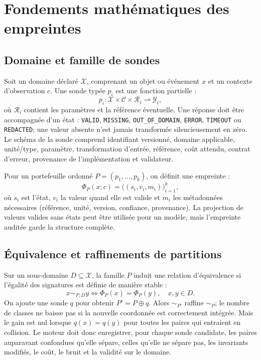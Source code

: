 \documentclass[11pt,a4paper]{report}
\newcommand{\FP}{\Phi}
\begin{document}
\chapter{Fondements mathématiques des empreintes}
\section{Domaine et famille de sondes}
Soit un domaine déclaré $\mathcal{X}$, comprenant un objet ou événement $x$ et un contexte d'observation $c$. Une sonde typée $p_i$ est une fonction partielle :
\[
 p_i: \mathcal{X}\times\mathcal{C}\times\mathcal{R}_i \rightharpoonup \mathcal{Y}_i,
\]
où $\mathcal{R}_i$ contient les paramètres et la référence éventuelle. Une réponse doit être accompagnée d'un état : \texttt{VALID}, \texttt{MISSING}, \texttt{OUT\_OF\_DOMAIN}, \texttt{ERROR}, \texttt{TIMEOUT} ou \texttt{REDACTED}; une valeur absente n'est jamais transformée silencieusement en zéro. Le schéma de la sonde comprend identifiant versionné, domaine applicable, unité/type, paramètre, transformation d'entrée, référence, coût attendu, contrat d'erreur, provenance de l'implémentation et validateur.

Pour un portefeuille ordonné $P=(p_1,\ldots,p_k)$, on définit une empreinte :
\[
 \FP_P(x;c)=\big((s_i,v_i,m_i)\big)_{i=1}^{k},
\]
où $s_i$ est l'état, $v_i$ la valeur quand elle est valide et $m_i$ les métadonnées nécessaires (référence, unité, version, confiance, provenance). La projection de valeurs valides sans états peut être utilisée pour un modèle, mais l'empreinte auditée garde la structure complète.

\section{Équivalence et raffinements de partitions}
Sur un sous-domaine $D\subseteq\mathcal{X}$, la famille $P$ induit une relation d'équivalence si l'égalité des signatures est définie de manière stable :
\[
 x\sim_{P,D}y\iff \FP_P(x)=\FP_P(y),\quad x,y\in D.
\]
On ajoute une sonde $q$ pour obtenir $P' = P\oplus q$. Alors $\sim_{P'}$ raffine $\sim_P$; le nombre de classes ne baisse pas si la nouvelle coordonnée est correctement intégrée. Mais le gain est nul lorsque $q(x)=q(y)$ pour toutes les paires qui entraient en collision. Le moteur doit donc enregistrer, pour chaque sonde candidate, les paires auparavant confondues qu'elle sépare, celles qu'elle ne sépare pas, les invariants modifiés, le coût, le bruit et la validité sur le domaine.
\end{document}
